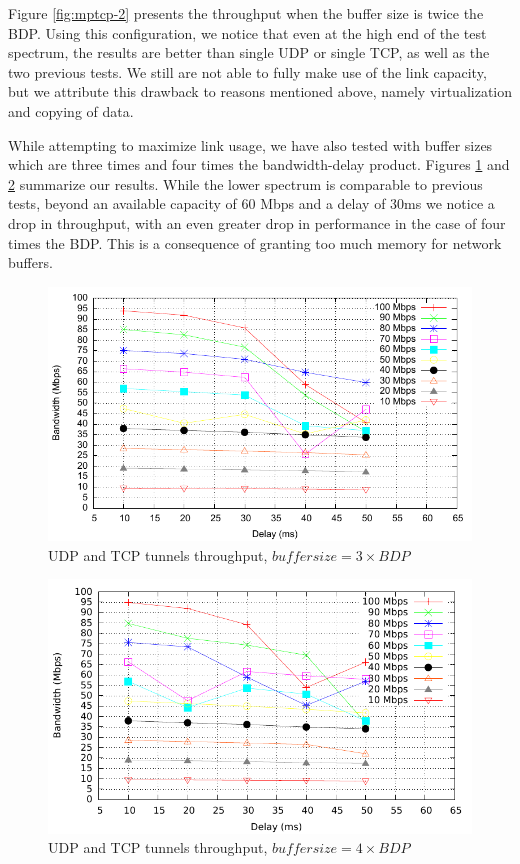 Figure \ref{fig:mptcp-2} presents the throughput when the buffer size is twice
the BDP. Using this configuration, we notice that even at the high end of the
test spectrum, the results are better than single UDP or single TCP, as well
as the two previous tests. We still are not able to fully make use of the link
capacity, but we attribute this drawback to reasons mentioned above, namely
virtualization and copying of data.

While attempting to maximize link usage, we have also tested with buffer sizes
which are three times and four times the bandwidth-delay product. Figures
\ref{fig:mptcp-3} and \ref{fig:mptcp-4} summarize our results. While the lower
spectrum is comparable to previous tests, beyond an available capacity of 60 Mbps
and a delay of 30ms we notice a drop in throughput, with an even greater drop
in performance in the case of four times the BDP. This is a consequence of
granting too much memory for network buffers.

\begin{figure}
  \centering
  \includegraphics[width=\textwidth]{img/test-mptcp-3}
  \caption{UDP and TCP tunnels throughput, $buffer size = 3 \times BDP$}
  \label{fig:mptcp-3}
\end{figure}

\begin{figure}
  \centering
  \includegraphics[width=\textwidth]{img/test-mptcp-4}
  \caption{UDP and TCP tunnels throughput, $buffer size = 4 \times BDP$}
  \label{fig:mptcp-4}
\end{figure}

